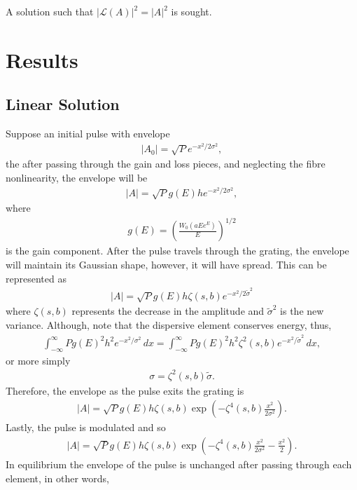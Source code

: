 \documentclass[12pt]{article}
\begin{document}
A solution such that $|\mathcal{L}(A)|^2 = |A|^2$ is sought.

\section{Results}
\subsection{Linear Solution}
Suppose an initial pulse with envelope
\begin{align*}
|A_0| = \sqrt{P} e^{-x^2 / 2 \sigma^2},
\end{align*}
the after passing through the gain and loss pieces, and neglecting the fibre nonlinearity, the envelope will be
\begin{align*}
|A| = \sqrt{P} g(E) h e^{-x^2 / 2 \sigma^2},
\end{align*}
where
\begin{align*}
g(E) = \left( \frac{W_0(a E e^E)}{E} \right)^{1/2}
\end{align*}
is the gain component. After the pulse travels through the grating, the envelope will maintain its Gaussian shape, however, it will have spread. This can be represented as
\begin{align*}
|A| = \sqrt{P} g(E) h \zeta(s, b) e^{-x^2 / 2 \tilde{\sigma}^2}
\end{align*}
where $\zeta(s, b)$ represents the decrease in the amplitude and $\widetilde{\sigma}^2$ is the new variance. Although, note that the dispersive element conserves energy, thus,
\begin{align*}
\int_{-\infty}^{\infty} P g(E)^2 h^2 e^{-x^2 / \sigma^2} \, dx = \int_{-\infty}^{\infty} P g(E)^2 h^2 \zeta^2(s, b) e^{-x^2 / \widetilde{\sigma}^2} \, dx,
\end{align*}
or more simply
\begin{align*}
\sigma = \zeta^2(s, b) \widetilde{\sigma}.
\end{align*}
Therefore, the envelope as the pulse exits the grating is
\begin{align*}
|A| = \sqrt{P} g(E) h \zeta(s, b) \exp \left( -\zeta^4(s, b) \frac{x^2}{2 \sigma^2} \right).
\end{align*}
Lastly, the pulse is modulated and so
\begin{align*}
|A| = \sqrt{P} g(E) h \zeta(s, b) \exp \left( -\zeta^4(s, b) \frac{x^2}{2 \sigma^2} - \frac{x^2}{2} \right).
\end{align*}
In equilibrium the envelope of the pulse is unchanged after passing through each element, in other words,
\end{document}
